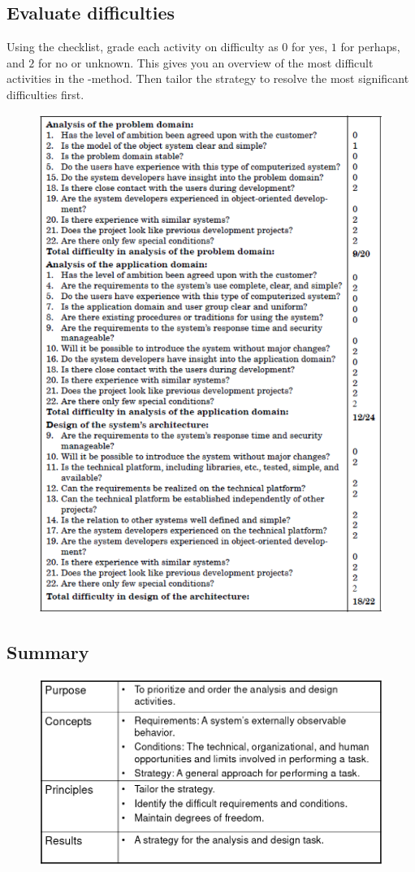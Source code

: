 \subsection{Evaluate difficulties}
Using the checklist, grade each activity on difficulty as $0$ for yes, $1$ for perhaps, and $2$ for no or unknown. This gives you an overview of the most difficult activities in the \ad-method. Then tailor the strategy to resolve the most significant difficulties first.
\begin{figure}[H]
    \centering
    \includegraphics[width=.7\textwidth]{figures/checklistevaluatediff.png}
\end{figure}

\subsection{Summary}
\begin{figure}[H]
    \centering
    \includegraphics[width=.7\textwidth]{figures/strategysummary.png}
\end{figure}

